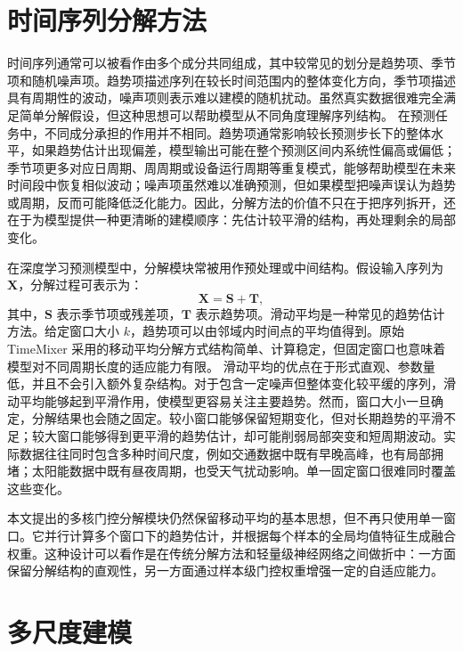 \section{时间序列分解方法}

时间序列通常可以被看作由多个成分共同组成，其中较常见的划分是趋势项、季节项和随机噪声项。趋势项描述序列在较长时间范围内的整体变化方向，季节项描述具有周期性的波动，噪声项则表示难以建模的随机扰动。虽然真实数据很难完全满足简单分解假设，但这种思想可以帮助模型从不同角度理解序列结构。
在预测任务中，不同成分承担的作用并不相同。趋势项通常影响较长预测步长下的整体水平，如果趋势估计出现偏差，模型输出可能在整个预测区间内系统性偏高或偏低；季节项更多对应日周期、周周期或设备运行周期等重复模式，能够帮助模型在未来时间段中恢复相似波动；噪声项虽然难以准确预测，但如果模型把噪声误认为趋势或周期，反而可能降低泛化能力。因此，分解方法的价值不只在于把序列拆开，还在于为模型提供一种更清晰的建模顺序：先估计较平滑的结构，再处理剩余的局部变化。

在深度学习预测模型中，分解模块常被用作预处理或中间结构。假设输入序列为 $\mathbf{X}$，分解过程可表示为：
\begin{equation}
    \mathbf{X} = \mathbf{S} + \mathbf{T},
\end{equation}
其中，$\mathbf{S}$ 表示季节项或残差项，$\mathbf{T}$ 表示趋势项。滑动平均是一种常见的趋势估计方法。给定窗口大小 $k$，趋势项可以由邻域内时间点的平均值得到。原始 TimeMixer 采用的移动平均分解方式结构简单、计算稳定，但固定窗口也意味着模型对不同周期长度的适应能力有限。
滑动平均的优点在于形式直观、参数量低，并且不会引入额外复杂结构。对于包含一定噪声但整体变化较平缓的序列，滑动平均能够起到平滑作用，使模型更容易关注主要趋势。然而，窗口大小一旦确定，分解结果也会随之固定。较小窗口能够保留短期变化，但对长期趋势的平滑不足；较大窗口能够得到更平滑的趋势估计，却可能削弱局部突变和短周期波动。实际数据往往同时包含多种时间尺度，例如交通数据中既有早晚高峰，也有局部拥堵；太阳能数据中既有昼夜周期，也受天气扰动影响。单一固定窗口很难同时覆盖这些变化。

本文提出的多核门控分解模块仍然保留移动平均的基本思想，但不再只使用单一窗口。它并行计算多个窗口下的趋势估计，并根据每个样本的全局均值特征生成融合权重。这种设计可以看作是在传统分解方法和轻量级神经网络之间做折中：一方面保留分解结构的直观性，另一方面通过样本级门控权重增强一定的自适应能力。

\section{多尺度建模}

